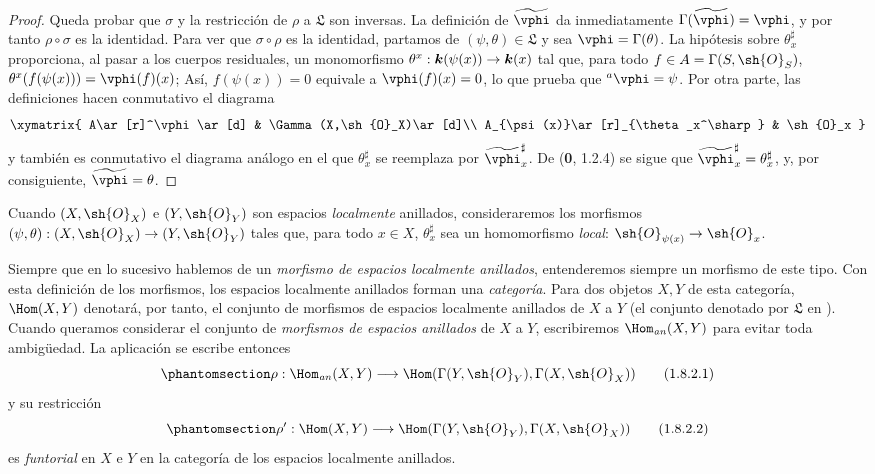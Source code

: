 \documentclass[oneside,10pt]{amsart}
\makeatletter
\newcommand{\ega@arrow}[2]{\mathchoice{#1}{#2}{#2}{#2}}
\renewcommand{\to}{\ega@arrow{\longrightarrow}{\rightarrow}}
\newcommand{\oldpage}[2][]{\marginnote{\normalfont\footnotesize\textbf{#1}~|~#2}\ignorespaces}
\let\EGAOriginalLabel\label
\renewcommand{\label}[1]{\phantomsection\EGAOriginalLabel{#1}}
\makeatother
\begin{document}
\begin{proof}
Queda probar que $\sigma$ y la restricción de $\rho$ a $\mathfrak L$
son inversas. La definición de $\widetilde{\vphi}$ da inmediatamente
$\Gamma(\widetilde{\vphi})=\vphi$, y por tanto $\rho\circ\sigma$ es la
identidad. Para ver que $\sigma\circ\rho$ es la identidad, partamos de
$(\psi,\theta)\in\mathfrak L$ y sea $\vphi=\Gamma(\theta)$. La
hipótesis sobre $\theta_x^\sharp$ proporciona, al pasar a los cuerpos
residuales, un monomorfismo
$\theta^x:\boldsymbol{k}(\psi(x))\to\boldsymbol{k}(x)$
tal que, para todo $f\in A=\Gamma(S,\sh{O}_S)$,
$\theta^x(f(\psi(x)))=\vphi(f)(x)$;
Así, $f(\psi(x))=0$ equivale a $\vphi(f)(x)=0$, lo que prueba que
${}^a\vphi=\psi$. Por otra parte, las definiciones hacen conmutativo
el diagrama
\[
  \xymatrix{
    A\ar[r]^\vphi\ar[d] &
    \Gamma(X,\sh{O}_X)\ar[d]\\
    A_{\psi(x)}\ar[r]_{\theta_x^\sharp} &
    \sh{O}_x
  }
\]
y también es conmutativo el diagrama análogo en el que
$\theta_x^\sharp$ se reemplaza por $\widetilde{\vphi}_x^\sharp$. De
(\textbf 0, 1.2.4) se sigue que
$\widetilde{\vphi}_x^\sharp=\theta_x^\sharp$, y, por consiguiente,
$\widetilde{\vphi}=\theta$.
\end{proof}

\begin{env}[1.8.2]
\label{ega2:addendum:I.1.8.2-fr}
Cuando $(X,\sh{O}_X)$ e $(Y,\sh{O}_Y)$ son espacios \emph{localmente}
anillados, consideraremos los morfismos
$(\psi,\theta):(X,\sh{O}_X)\to(Y,\sh{O}_Y)$ tales que, para todo
$x\in X$, $\theta_x^\sharp$ sea un homomorfismo \emph{local}: $\sh{O}_{\psi(x)}\to\sh{O}_x$.

Siempre que en lo sucesivo hablemos de un
\oldpage[II]{219}
\emph{morfismo de espacios localmente anillados}, entenderemos siempre
un morfismo de este tipo. Con esta definición de los morfismos, los
espacios localmente anillados forman una \emph{categoría}. Para dos objetos
$X,Y$ de esta categoría, $\Hom(X,Y)$ denotará, por tanto, el conjunto
de morfismos de espacios localmente anillados de $X$ a $Y$ (el
conjunto denotado por $\mathfrak L$ en ). Cuando queramos
considerar el conjunto de \emph{morfismos de espacios anillados} de $X$ a
$Y$, escribiremos $\Hom_{\mathit{an}}(X,Y)$ para evitar toda
ambigüedad. La aplicación  se escribe entonces
\begin{equation}
\label{ega2:addendum:I.1.8.2.1-fr}
  \rho:\Hom_{\mathit{an}}(X,Y)
  \to\Hom(\Gamma(Y,\sh{O}_Y),\Gamma(X,\sh{O}_X))
\tag{1.8.2.1}
\end{equation}
y su restricción
\begin{equation}
\label{ega2:addendum:I.1.8.2.2-fr}
  \rho':\Hom(X,Y)
  \to\Hom(\Gamma(Y,\sh{O}_Y),\Gamma(X,\sh{O}_X))
\tag{1.8.2.2}
\end{equation}
es \emph{funtorial} en $X$ e $Y$ en la categoría de los espacios localmente
anillados.
\end{env}
\end{document}
